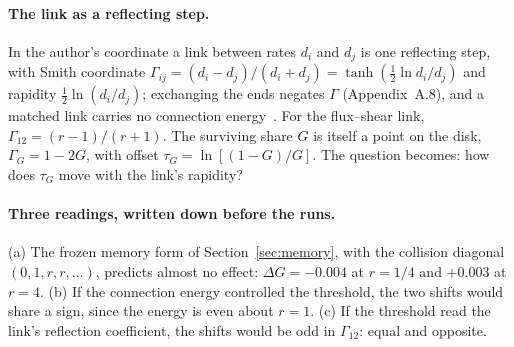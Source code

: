 \documentclass[11pt]{article}
\begin{document}
\paragraph{The link as a reflecting step.} In the author's coordinate a link between rates $d_i$ and $d_j$ is one reflecting step, with Smith coordinate $\Gamma_{ij}=(d_i-d_j)/(d_i+d_j)=\tanh(\tfrac12\ln d_i/d_j)$ and rapidity $\tfrac12\ln(d_i/d_j)$; exchanging the ends negates $\Gamma$ (Appendix~A.8), and a matched link carries no connection energy~\cite{CE}. For the flux--shear link, $\Gamma_{12}=(r-1)/(r+1)$. The surviving share $G$ is itself a point on the disk, $\Gamma_G=1-2G$, with offset $\tau_G=\ln[(1-G)/G]$. The question becomes: how does $\tau_G$ move with the link's rapidity?

\paragraph{Three readings, written down before the runs.} (a) The frozen memory form of Section~\ref{sec:memory}, with the collision diagonal $(0,1,r,r,\dots)$, predicts almost no effect: $\Delta G=-0.004$ at $r=1/4$ and $+0.003$ at $r=4$. (b) If the connection energy controlled the threshold, the two shifts would share a sign, since the energy is even about $r=1$. (c) If the threshold read the link's reflection coefficient, the shifts would be odd in $\Gamma_{12}$: equal and opposite.
\end{document}
